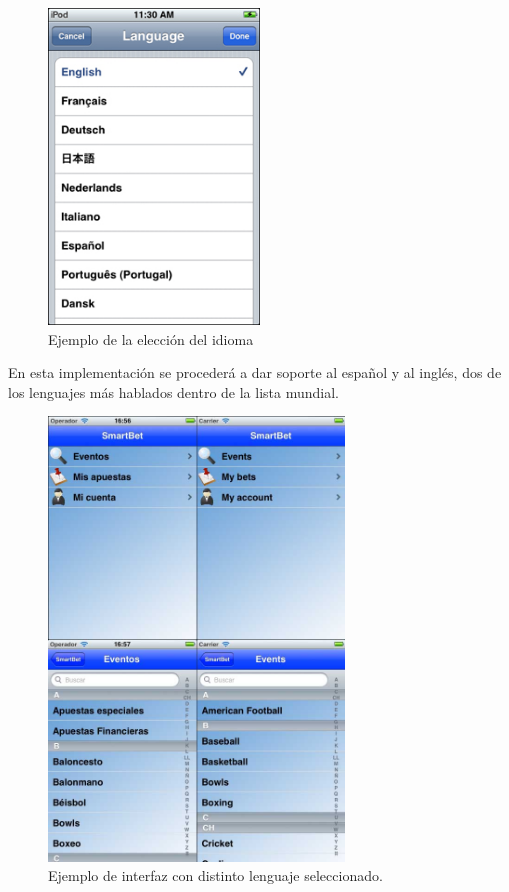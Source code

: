   \begin{figure}[h!]
    \centering
       \includegraphics[width=0.5\textwidth]{./images/language.jpg}
     \caption{Ejemplo de la elección del idioma }
   \label{fig:Vista de las preferencias del idioma}
\end{figure}

 
  En esta implementación se procederá a dar soporte al español y al inglés, dos de los lenguajes más hablados dentro de la lista mundial.
  
  
  
  \begin{figure}[h!]
  	\centering 
  		\includegraphics[width=0.7\textwidth]{./images/lenguajes.jpg}
	\caption{Ejemplo de interfaz con distinto lenguaje seleccionado.} 
	\label{fig:Ejemplo de interfaz con distinto lenguaje seleccionado.}
\end{figure} 
  
